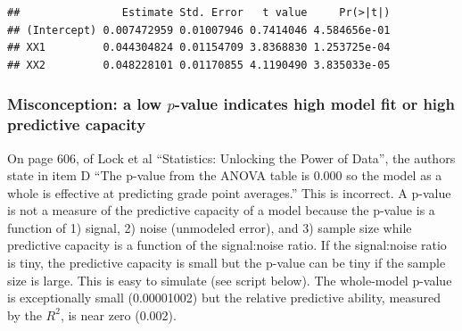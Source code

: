 \documentclass[]{book}
\newenvironment{Shaded}{\begin{snugshade}}{\end{snugshade}}
\newcommand{\KeywordTok}[1]{\textcolor[rgb]{0.13,0.29,0.53}{\textbf{#1}}}
\newcommand{\DataTypeTok}[1]{\textcolor[rgb]{0.13,0.29,0.53}{#1}}
\newcommand{\DecValTok}[1]{\textcolor[rgb]{0.00,0.00,0.81}{#1}}
\newcommand{\FloatTok}[1]{\textcolor[rgb]{0.00,0.00,0.81}{#1}}
\newcommand{\StringTok}[1]{\textcolor[rgb]{0.31,0.60,0.02}{#1}}
\newcommand{\OperatorTok}[1]{\textcolor[rgb]{0.81,0.36,0.00}{\textbf{#1}}}
\newcommand{\NormalTok}[1]{#1}
\begin{document}
\begin{Shaded}
\end{Shaded}

\begin{verbatim}
##                Estimate Std. Error   t value     Pr(>|t|)
## (Intercept) 0.007472959 0.01007946 0.7414046 4.584656e-01
## XX1         0.044304824 0.01154709 3.8368830 1.253725e-04
## XX2         0.048228101 0.01170855 4.1190490 3.835033e-05
\end{verbatim}

\subsubsection{\texorpdfstring{Misconception: a low \(p\)-value
indicates high model fit or high predictive
capacity}{Misconception: a low p-value indicates high model fit or high predictive capacity}}\label{misconception-a-low-p-value-indicates-high-model-fit-or-high-predictive-capacity}

On page 606, of Lock et al ``Statistics: Unlocking the Power of Data'',
the authors state in item D ``The p-value from the ANOVA table is 0.000
so the model as a whole is effective at predicting grade point
averages.'' This is incorrect. A p-value is not a measure of the
predictive capacity of a model because the p-value is a function of 1)
signal, 2) noise (unmodeled error), and 3) sample size while predictive
capacity is a function of the signal:noise ratio. If the signal:noise
ratio is tiny, the predictive capacity is small but the p-value can be
tiny if the sample size is large. This is easy to simulate (see script
below). The whole-model p-value is exceptionally small (0.00001002) but
the relative predictive ability, measured by the \(R^2\), is near zero
(0.002).
\end{document}
